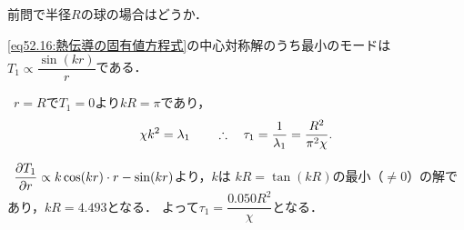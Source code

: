 
\begin{mondai}{}{}
前問で半径$R$の球の場合はどうか．
\end{mondai}
\begin{kaitou}
\eqref{eq52.16:熱伝導の固有値方程式}の中心対称解のうち最小のモードは$T_1 \propto \dfrac{\sin (kr)}{r}$である．



\noindent{}\,
$r=R$で$T_1=0$より$kR=\pi$であり，
\[
    \chi k^2 = \lambda_1
    \qquad \therefore\quad \tau_1 = \frac{1}{\lambda_1} = \frac{R^2}{\pi^2\chi} .
\]


\noindent{}\,
$\dpdv{T_1}{r} \propto k \cos(kr) \cdot r - \sin (kr)$より，$k$は
$kR = \tan(kR)$の最小（$\neq 0$）の解であり，$kR = 4.493$となる．
よって$\tau_1 = \dfrac{0.050 R^2}{\chi}$となる．




\end{kaitou}



\BackToTheToc